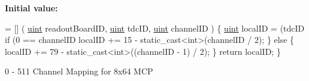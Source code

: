 {\bfseries Initial value\+:}
\begin{DoxyCode}
= [] (
    \hyperlink{_packet_8cpp_a69aa29b598b851b0640aa225a9e5d61d}{uint} readoutBoardID,
    \hyperlink{_packet_8cpp_a69aa29b598b851b0640aa225a9e5d61d}{uint} tdcID,
    \hyperlink{_packet_8cpp_a69aa29b598b851b0640aa225a9e5d61d}{uint} channelID
) \{
    \hyperlink{_packet_8cpp_a69aa29b598b851b0640aa225a9e5d61d}{uint} localID = (tdcID%
    \textcolor{keywordflow}{if} (0 == channelID%
        localID += 15 - \textcolor{keyword}{static\_cast<}\textcolor{keywordtype}{int}\textcolor{keyword}{>}(channelID / 2); 
    \} \textcolor{keywordflow}{else} \{
        localID += 79 - \textcolor{keyword}{static\_cast<}\textcolor{keywordtype}{int}\textcolor{keyword}{>}((channelID - 1) / 2); 
    \}
    \textcolor{keywordflow}{return} localID;
\}
\end{DoxyCode}


0 -\/ 511 Channel Mapping for 8x64 M\+CP 

